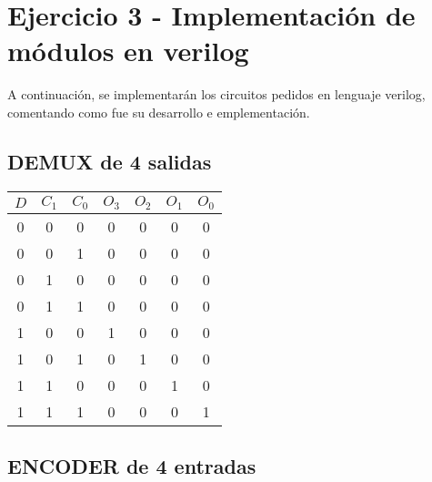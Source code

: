 \section{Ejercicio 3 - Implementación de módulos en verilog}
A continuación, se implementarán los circuitos pedidos en lenguaje verilog, comentando como fue su desarrollo e emplementación.
\subsection{DEMUX de 4 salidas}








\begin{table}[H]
	\begin{center}
		\begin{tabular}{ccc||cccc}

			$D$ &	$C_1$ &	$C_0$ &	$O_3$ & $O_2$ & $O_1$ &$O_0$ \\
			\hline
            0 & 0 & 0 & 0 & 0 & 0 & 0 \\
            
            0 & 0 & 1 & 0 & 0 & 0 & 0 \\
            
            0 & 1 & 0 & 0 & 0 & 0 & 0 \\
            
            0 & 1 & 1 & 0 & 0 & 0 & 0 \\
            
            1 & 0 & 0 & 1 & 0 & 0 & 0 \\
            
            1 & 0 & 1 & 0 & 1 & 0 & 0 \\
            
            1 & 1 & 0 & 0 & 0 & 1 & 0 \\
            
            1 & 1 & 1 & 0 & 0 & 0 & 1\\
			
		\end{tabular}
	\end{center}
\end{table}

\subsection{ENCODER de 4 entradas}

